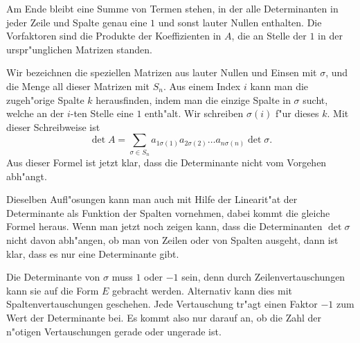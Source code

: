 Am Ende bleibt eine Summe von Termen stehen, in der alle Determinanten
in jeder Zeile und Spalte genau eine $1$ und sonst lauter Nullen
enthalten. Die Vorfaktoren sind die Produkte der Koeffizienten in $A$,
die an Stelle der $1$ in der urspr"unglichen Matrizen standen.

Wir bezeichnen die speziellen Matrizen aus lauter Nullen und Einsen
mit $\sigma$, und die Menge all dieser Matrizen mit $S_n$. Aus einem
Index $i$ kann man die zugeh"orige Spalte $k$ herausfinden, indem
man die einzige Spalte in $\sigma$ sucht, welche an der $i$-ten
Stelle eine $1$ enth"alt. Wir schreiben $\sigma(i)$ f"ur dieses $k$.
Mit dieser Schreibweise ist 
\[
\det A=\sum_{\sigma\in S_n}
a_{1\sigma(1)}
a_{2\sigma(2)}
\dots
a_{n\sigma(n)}
\det \sigma.
\]
Aus dieser Formel ist jetzt klar, dass die Determinante nicht vom
Vorgehen abh"angt.

Dieselben Aufl"osungen kann man auch mit Hilfe der Linearit"at der
Determinante als Funktion der Spalten vornehmen, dabei kommt die 
gleiche Formel heraus. Wenn man jetzt noch zeigen kann, dass
die Determinanten $\det\sigma$ nicht davon abh"angen, ob man von
Zeilen oder von Spalten ausgeht, dann ist klar, dass es nur eine
Determinante gibt.

Die Determinante von $\sigma$ muss $1$ oder $-1$ sein, denn durch
Zeilenvertauschungen kann sie auf die Form $E$ gebracht werden.
Alternativ kann dies mit Spaltenvertauschungen geschehen. Jede
Vertauschung tr"agt einen Faktor $-1$ zum Wert der Determinante
bei. Es kommt also nur darauf an, ob die Zahl der n"otigen
Vertauschungen gerade oder ungerade ist.
